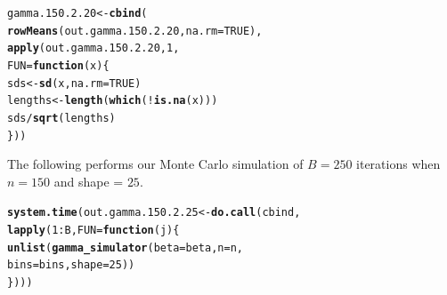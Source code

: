 \documentclass[11pt]{article}\usepackage[]{graphicx}\usepackage[]{color}
\makeatletter
\newcommand{\hlnum}[1]{\textcolor[rgb]{0.686,0.059,0.569}{#1}}%
\newcommand{\hlopt}[1]{\textcolor[rgb]{0,0,0}{#1}}%
\newcommand{\hlstd}[1]{\textcolor[rgb]{0.345,0.345,0.345}{#1}}%
\newcommand{\hlkwa}[1]{\textcolor[rgb]{0.161,0.373,0.58}{\textbf{#1}}}%
\newcommand{\hlkwb}[1]{\textcolor[rgb]{0.69,0.353,0.396}{#1}}%
\newcommand{\hlkwc}[1]{\textcolor[rgb]{0.333,0.667,0.333}{#1}}%
\newcommand{\hlkwd}[1]{\textcolor[rgb]{0.737,0.353,0.396}{\textbf{#1}}}%
\newenvironment{kframe}{%
 \def\at@end@of@kframe{}%
 \ifinner\ifhmode%
  \def\at@end@of@kframe{\end{minipage}}%
  \begin{minipage}{\columnwidth}%
 \fi\fi%
 \def\FrameCommand##1{\hskip\@totalleftmargin \hskip-\fboxsep
 \colorbox{shadecolor}{##1}\hskip-\fboxsep
     \hskip-\linewidth \hskip-\@totalleftmargin \hskip\columnwidth}%
 \MakeFramed {\advance\hsize-\width
   \@totalleftmargin\z@ \linewidth\hsize
   \@setminipage}}%
 {\par\unskip\endMakeFramed%
 \at@end@of@kframe}
\newenvironment{knitrout}{}{} %
\makeatother
\begin{document}
\begin{knitrout}
\color{fgcolor}\begin{kframe}
\begin{alltt}
\hlstd{gamma.150.2.20} \hlkwb{<-} \hlkwd{cbind}\hlstd{(}
  \hlkwd{rowMeans}\hlstd{(out.gamma.150.2.20,} \hlkwc{na.rm} \hlstd{=} \hlnum{TRUE}\hlstd{),}
  \hlkwd{apply}\hlstd{(out.gamma.150.2.20,} \hlnum{1}\hlstd{,}
  \hlkwc{FUN} \hlstd{=} \hlkwa{function}\hlstd{(}\hlkwc{x}\hlstd{)\{}
    \hlstd{sds} \hlkwb{<-} \hlkwd{sd}\hlstd{(x,} \hlkwc{na.rm} \hlstd{=} \hlnum{TRUE}\hlstd{)}
    \hlstd{lengths} \hlkwb{<-} \hlkwd{length}\hlstd{(}\hlkwd{which}\hlstd{(}\hlopt{!}\hlkwd{is.na}\hlstd{(x)))}
    \hlstd{sds} \hlopt{/} \hlkwd{sqrt}\hlstd{(lengths)}
  \hlstd{\}))}
\end{alltt}


{\ttfamily\noindent\bfseries\color{errorcolor}{\#\# Error in is.data.frame(x): object 'out.gamma.150.2.20' not found}}\end{kframe}
\end{knitrout}

The following performs our Monte Carlo simulation of $B = 250$ iterations 
when $n = 150$ and shape = $25$.

\begin{knitrout}
\color{fgcolor}\begin{kframe}
\begin{alltt}
\hlkwd{system.time}\hlstd{(out.gamma.150.2.25} \hlkwb{<-} \hlkwd{do.call}\hlstd{(cbind,}
  \hlkwd{lapply}\hlstd{(}\hlnum{1}\hlopt{:}\hlstd{B,} \hlkwc{FUN} \hlstd{=} \hlkwa{function}\hlstd{(}\hlkwc{j}\hlstd{)\{}
    \hlkwd{unlist}\hlstd{(}\hlkwd{gamma_simulator}\hlstd{(}\hlkwc{beta} \hlstd{= beta,} \hlkwc{n} \hlstd{= n,}
      \hlkwc{bins} \hlstd{= bins,} \hlkwc{shape} \hlstd{=} \hlnum{25}\hlstd{))}
\hlstd{\})))}
\end{alltt}


{\ttfamily\noindent\bfseries\color{errorcolor}{\#\# Error in eval(predvars, data, env): object 'x1' not found}}

{\ttfamily\noindent\itshape\color{messagecolor}{\#\# Timing stopped at: 0.002 0 0.002}}\end{kframe}
\end{knitrout}
\end{document}
